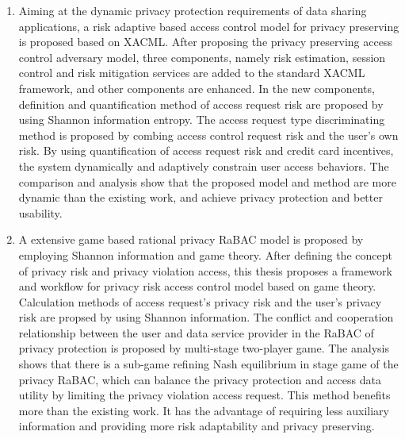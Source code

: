 \begin{englishabstract}
\begin{enumerate}
		\item 	
		Aiming at the dynamic privacy protection requirements of data sharing applications, a risk adaptive based access control model for privacy preserving is proposed based on XACML. After proposing the privacy preserving access control adversary model, three components, namely risk estimation, session control and risk mitigation services are added to the standard XACML framework, and other components are enhanced. In the new components, definition and quantification method of access request risk are proposed by using Shannon information entropy.  The access request type discriminating method is proposed by combing access control request risk  and the user's own risk. By using quantification of access request risk and  credit card incentives, the system dynamically and adaptively constrain user access behaviors. The comparison and analysis show that the proposed model and method are more dynamic than the existing work, and achieve privacy protection and better usability.
		
		\item 		
		A extensive game based rational privacy RaBAC model is proposed by employing Shannon information and game theory. After defining the concept of privacy risk and privacy violation access, this thesis proposes a framework and workflow for privacy risk access control model based on game theory. Calculation methods of access request's privacy risk and  the user's privacy risk are propsed by using Shannon information.
		 The conflict and cooperation relationship between the user and data service provider in the RaBAC of privacy protection is proposed by multi-stage two-player game. The analysis shows that there is a sub-game refining Nash equilibrium in stage game of the privacy RaBAC, which can balance the privacy protection and access data utility by limiting the privacy violation access request. This method benefits more than the existing work. It has the advantage of requiring less auxiliary information and providing more risk adaptability and privacy preserving.
		

\end{enumerate}
\end{englishabstract}
